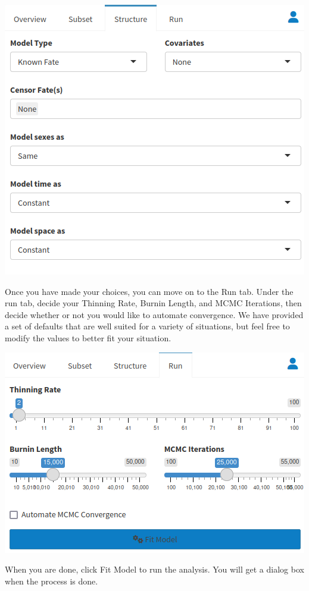 \documentclass[
]{book}
\begin{document}
\includegraphics{./www/surv_walk6.png}

Once you have made your choices, you can move on to the Run tab. Under the run tab, decide your Thinning Rate, Burnin Length, and MCMC Iterations, then decide whether or not you would like to automate convergence. We have provided a set of defaults that are well suited for a variety of situations, but feel free to modify the values to better fit your situation.

\includegraphics{./www/surv_walk7.png}

When you are done, click {Fit Model} to run the analysis. You will get a dialog box when the process is done.
\end{document}
